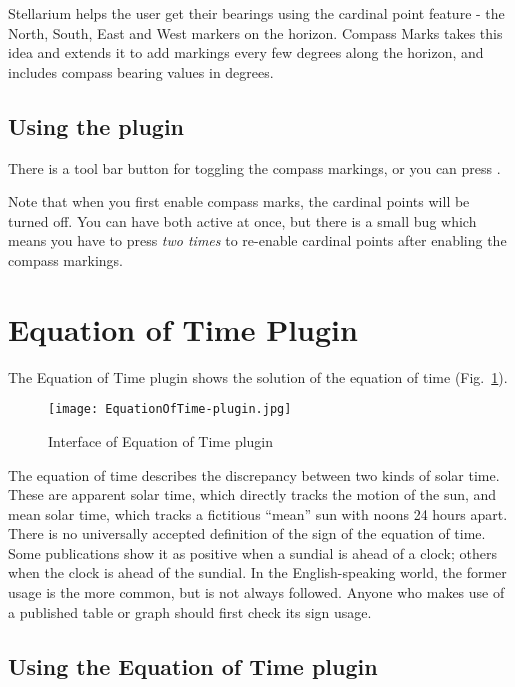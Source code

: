 
Stellarium helps the user get their bearings using the cardinal point
feature - the North, South, East and West markers on the horizon.
Compass Marks takes this idea and extends it to add markings every few
degrees along the horizon, and includes compass bearing values in
degrees.

\subsection{Using the plugin}
\label{sec:plugins:CompassMarks:using}

There is a tool bar button for toggling the compass markings, or you can
press .

Note that when you first enable compass marks, the cardinal points will
be turned off. You can have both active at once, but there is a small
bug which means you have to press  \emph{two times} to
re-enable cardinal points after enabling the compass markings.

\newpage

\section{Equation of Time Plugin}
\label{sec:plugins:EquationOfTime}
The Equation of Time plugin shows the solution of the equation of time (Fig.~\ref{fig:EqOfTime}).

\begin{figure}[h]
\texttt{[image: EquationOfTime-plugin.jpg]}
\label{fig:EqOfTime}
\caption{Interface of Equation of Time plugin}
\end{figure}

The equation of time describes the discrepancy between two kinds of solar time. These are apparent solar time, which directly tracks the motion of the sun, and mean solar time, which tracks a fictitious ``mean'' sun with noons 24 hours apart. There is no universally accepted definition of the sign of the equation of time. Some publications show it as positive when a sundial is ahead of a clock; others when the clock is ahead of the sundial. In the English-speaking world, the former usage is the more common, but is not always followed. Anyone who makes use of a published table or graph should first check its sign usage.

\subsection{Using the Equation of Time plugin}
\label{sec:plugins:EquationOfTime:using}

